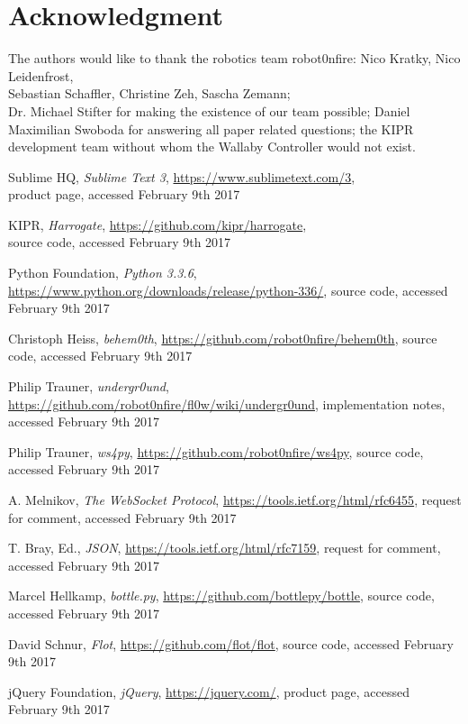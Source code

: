 \documentclass[conference]{IEEEtran}
\begin{document}
\section*{Acknowledgment}
The authors would like to thank the robotics team robot0nfire: Nico Kratky, Nico Leidenfrost,\\ Sebastian Schaffler, Christine Zeh, Sascha Zemann;\\ Dr. Michael Stifter for making the existence of our team possible; Daniel Maximilian Swoboda for answering all paper related questions; the KIPR development team without whom the Wallaby Controller would not exist.

\begin{thebibliography}{1}

Sublime HQ, \emph{Sublime Text 3}, \url{https://www.sublimetext.com/3},\\ product page,
accessed February 9th 2017

KIPR, \emph{Harrogate}, \url{https://github.com/kipr/harrogate},\\ source code,
accessed February 9th 2017

Python Foundation, \emph{Python 3.3.6}, \url{https://www.python.org/downloads/release/python-336/}, source code, accessed February 9th 2017

Christoph Heiss, \emph{behem0th}, \url{https://github.com/robot0nfire/behem0th}, source code, accessed February 9th 2017

Philip Trauner, \emph{undergr0und}, \url{https://github.com/robot0nfire/fl0w/wiki/undergr0und}, implementation notes, accessed February 9th 2017

Philip Trauner, \emph{ws4py}, \url{https://github.com/robot0nfire/ws4py}, source code, accessed February 9th 2017

A. Melnikov, \emph{The WebSocket Protocol}, \url{https://tools.ietf.org/html/rfc6455}, request for comment, accessed February 9th 2017

T. Bray, Ed., \emph{JSON}, \url{https://tools.ietf.org/html/rfc7159}, request for comment, accessed February 9th 2017

Marcel Hellkamp, \emph{bottle.py}, \url{https://github.com/bottlepy/bottle}, source code, accessed February 9th 2017

David Schnur, \emph{Flot}, \url{https://github.com/flot/flot}, source code, accessed February 9th 2017

jQuery Foundation, \emph{jQuery}, \url{https://jquery.com/}, product page, accessed February 9th 2017

\end{thebibliography}
\end{document}
